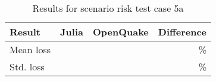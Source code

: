 \begin{table}[htbp]

\centering
\begin{tabular}{ l r r r }

\hline
\rowcolor{anti-flashwhite}
\bf{Result} & \bf{Julia} & \bf{OpenQuake} & \bf{Difference}\\
\hline
Mean loss &  &  & \% \\
Std. loss &  &  & \% \\
\hline
\end{tabular}

\caption{Results for scenario risk test case 5a}
\label{tab:result-sr-5a}
\end{table}